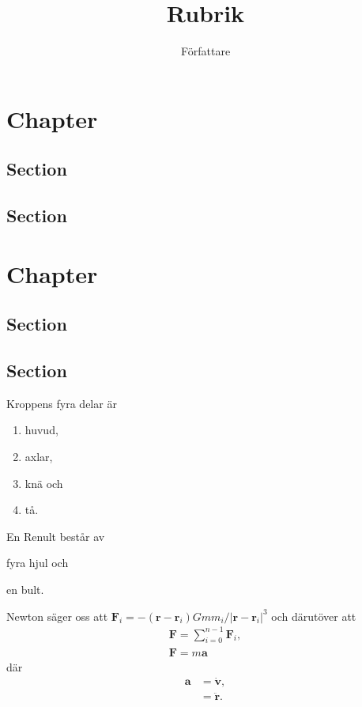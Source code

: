 \documentclass[a4paper, article]{memoir}
\title{Rubrik}
\author{Författare}
\begin{document}
\maketitle

\chapter{Chapter}
\section{Section}
\section{Section}

\chapter{Chapter}
\section{Section}
\section{Section}

Kroppens fyra delar är
\begin{enumerate}
\item huvud,
\item axlar,
\item knä och
\item tå.
\end{enumerate}
En Renult består av
\begin{enumerate*}[label=(\alph*)]
\item fyra hjul och
\item en bult.
\end{enumerate*}

Newton säger oss att $\mathbf{F}_i = -(\mathbf{r}-\mathbf{r}_i)Gmm_i/|\mathbf{r}-\mathbf{r}_i|^3$ och därutöver att
\begin{align}
\mathbf{F} = \sum_{i=0}^{n-1} \mathbf{F}_i, \\
\mathbf{F} = m\mathbf{a}
\end{align}
där
\begin{align}
\mathbf{a} &= \dot{\mathbf{v}}, \nonumber \\
&= \ddot{\mathbf{r}}.
\end{align}
\end{document}
